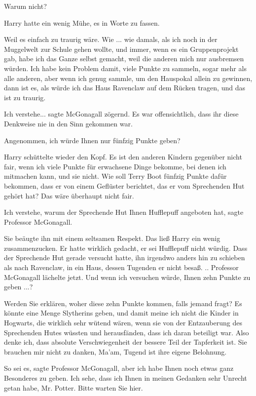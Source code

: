 \glqq Warum nicht?\grqq{}

Harry hatte ein wenig Mühe, es in Worte zu fassen.

\glqq Weil es einfach zu traurig wäre. Wie ... wie damals, als ich noch in der
Muggelwelt zur Schule gehen wollte, und immer, wenn es ein Gruppenprojekt gab,
habe ich das Ganze selbst gemacht, weil die anderen mich nur ausbremsen würden.
Ich habe kein Problem damit, viele Punkte zu sammeln, sogar mehr als alle
anderen, aber wenn ich genug sammle, um den Hauspokal allein zu gewinnen, dann
ist es, als würde ich das Haus Ravenclaw auf dem Rücken tragen, und das ist zu
traurig.\grqq{}

\glqq Ich verstehe...\grqq{} sagte McGonagall zögernd. Es war offensichtlich,
dass ihr diese Denkweise nie in den Sinn gekommen war.

\glqq Angenommen, ich würde Ihnen nur fünfzig Punkte geben?\grqq{}

Harry schüttelte wieder den Kopf. \glqq Es ist den anderen Kindern gegenüber
nicht fair, wenn ich viele Punkte für erwachsene Dinge bekomme, bei denen ich
mitmachen kann, und sie nicht. Wie soll Terry Boot fünfzig Punkte dafür
bekommen, dass er von einem Geflüster berichtet, das er vom Sprechenden Hut
gehört hat? Das wäre überhaupt nicht fair.\grqq{}

\glqq Ich verstehe, warum der Sprechende Hut Ihnen Hufflepuff angeboten
hat\grqq{}, sagte Professor McGonagall.

Sie beäugte ihn mit einem seltsamen Respekt. Das ließ Harry ein wenig
zusammenzucken. Er hatte wirklich gedacht, er sei Hufflepuff nicht würdig. Dass
der Sprechende Hut gerade versucht hatte, ihn irgendwo anders hin zu schieben
als nach Ravenclaw, in ein Haus, dessen Tugenden er nicht besaß. .. Professor
McGonagall lächelte jetzt. \glqq Und wenn ich versuchen würde, Ihnen zehn Punkte
zu geben ...?\grqq{}

\glqq Werden Sie erklären, woher diese zehn Punkte kommen, falls jemand fragt?
Es könnte eine Menge Slytherins geben, und damit meine ich nicht die Kinder in
Hogwarts, die wirklich sehr wütend wären, wenn sie von der Entzauberung des
Sprechenden Hutes wüssten und herausfänden, dass ich daran beteiligt war. Also
denke ich, dass absolute Verschwiegenheit der bessere Teil der Tapferkeit ist.
Sie brauchen mir nicht zu danken, Ma'am, Tugend ist ihre eigene
Belohnung.\grqq{}

\glqq So sei es\grqq{}, sagte Professor McGonagall, \glqq aber ich habe Ihnen
noch etwas ganz Besonderes zu geben. Ich sehe, dass ich Ihnen in meinen Gedanken
sehr Unrecht getan habe, Mr. Potter. Bitte warten Sie hier.\grqq{}

